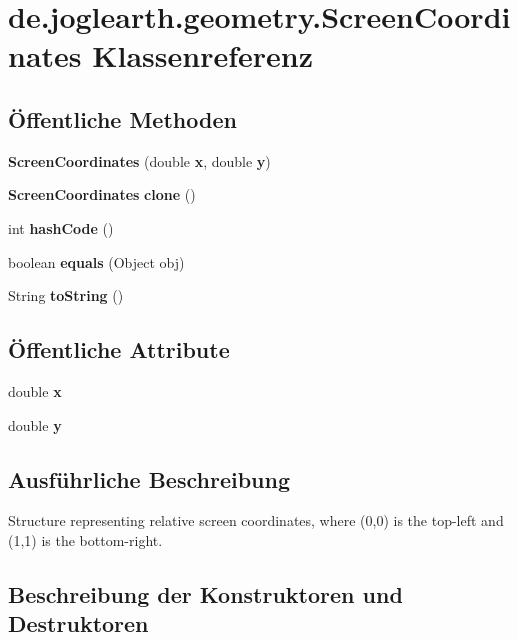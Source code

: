 \section{de.\-joglearth.\-geometry.\-Screen\-Coordinates Klassenreferenz}
\label{classde_1_1joglearth_1_1geometry_1_1_screen_coordinates}
\subsection*{Öffentliche Methoden}
\begin{DoxyCompactItemize}
\item 
{\bf Screen\-Coordinates} (double {\bf x}, double {\bf y})
\item 
{\bf Screen\-Coordinates} {\bfseries clone} ()\label{classde_1_1joglearth_1_1geometry_1_1_screen_coordinates_a331deb737a91c46e453ea2ea1639ca0e}

\item 
int {\bfseries hash\-Code} ()\label{classde_1_1joglearth_1_1geometry_1_1_screen_coordinates_a7e35e8e493e19c3e0e0af19408423fab}

\item 
boolean {\bfseries equals} (Object obj)\label{classde_1_1joglearth_1_1geometry_1_1_screen_coordinates_a2471c92c5ffd1a500a647e86b316510c}

\item 
String {\bfseries to\-String} ()\label{classde_1_1joglearth_1_1geometry_1_1_screen_coordinates_aebaa9728690fe826983dc18e09f4fa07}

\end{DoxyCompactItemize}
\subsection*{Öffentliche Attribute}
\begin{DoxyCompactItemize}
\item 
double {\bf x}
\item 
double {\bf y}
\end{DoxyCompactItemize}


\subsection{Ausführliche Beschreibung}
Structure representing relative screen coordinates, where (0,0) is the top-\/left and (1,1) is the bottom-\/right. 

\subsection{Beschreibung der Konstruktoren und Destruktoren}
